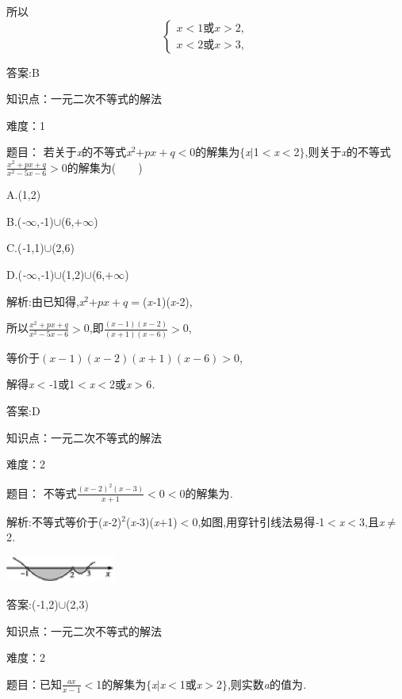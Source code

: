 \documentclass{article} %
\begin{document}
所以
\[
\begin{cases}
x<1 \text{或} x>2,\\
x<2 \text{或} x>3,
\end{cases}
\]

 答案:B

知识点：一元二次不等式的解法

难度：1

 题目： 若关于\textit{x}的不等式\textit{x}${}^{2}$\textit{$+px+q<$}0的解集为$\mathrm{\{}$\textit{x$ |$}1\textit{$<$x$<$}2$\mathrm{\}}$,则关于\textit{x}的不等式$\frac{x^2+px+q}{x^2-5x-6}$\textit{$>$}0的解集为(\textit{　　})

 A.(1,2)

 B.(\textit{-$\infty$},\textit{-}1)$\mathrm{\cup}$(6,\textit{$+\infty$})

 C.(\textit{-}1,1)$\mathrm{\cup}$(2,6)

 D.(\textit{-$\infty$},\textit{-}1)$\mathrm{\cup}$(1,2)$\mathrm{\cup}$(6,\textit{$+\infty$})

 解析:由已知得,\textit{x}${}^{2}$\textit{$+px+q=$}(\textit{x-}1)(\textit{x-}2),

所以$\frac{x^2+px+q}{x^2-5x-6} $\textit{$>$}0,即$\frac{(x-1)(x-2)}{(x+1)(x-6)}$\textit{$>$}0,

等价于$(x-1)(x-2)(x+1)(x-6)>0$,

解得\textit{x$<$-}1或1\textit{$<$x$<$}2或\textit{x$>$}6\textit{.}

 答案:D

知识点：一元二次不等式的解法

难度：2


 题目：
不等式$ \frac{{(x-2)}^2(x-3)}{x+1}<0$\textit{$<$}0的解集为\textit{\underbar{　　　　　}.~}

 解析:不等式等价于(\textit{x-}2)${}^{2}$(\textit{x-}3)(\textit{x$+$}1)\textit{$<$}0,如图,用穿针引线法易得\textit{-}1\textit{$<$x$<$}3,且\textit{x}$\mathrm{\neq}$2\textit{.}

 \includegraphics*[width=1.43in, height=0.34in, keepaspectratio=false]{image1281}

 答案:(\textit{-}1,2)$\mathrm{\cup}$(2,3)

知识点：一元二次不等式的解法

难度：2

 题目：已知$\frac{ax}{x-1}$\textit{$<$}1的解集为$\mathrm{\{}$\textit{x$|$x$<$}1或\textit{x$>$}2$\mathrm{\}}$,则实数\textit{a}的值为\textit{\underbar{　　　　　}.~}
\end{document}
